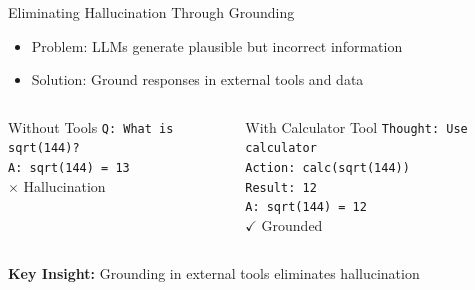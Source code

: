 \documentclass[aspectratio=169]{beamer}
\begin{document}
\begin{frame}{Eliminating Hallucination Through Grounding}
	\begin{itemize}
		\item {\color{highlight}Problem}: LLMs generate plausible but incorrect information
		\item {\color{highlight}Solution}: Ground responses in external tools and data
	\end{itemize}
	
	\begin{columns}
		\begin{block}{Without Tools}
			\small
			\texttt{Q: What is sqrt(144)?} \\
			\texttt{A: sqrt(144) = 13} \\
			{\color{red}$\times$ Hallucination}
		\end{block}
		
		\begin{block}{With Calculator Tool}
			\small
			\texttt{Thought: Use calculator} \\
			\texttt{Action: calc(sqrt(144))} \\
			\texttt{Result: 12} \\
			\texttt{A: sqrt(144) = 12} \\
			{\color{green}$\checkmark$ Grounded}
		\end{block}
	\end{columns}
	
	\vspace{0.5cm}
	
	\begin{center}
		\textbf{Key Insight:} Grounding in external tools eliminates hallucination
	\end{center}
\end{frame}
\end{document}
